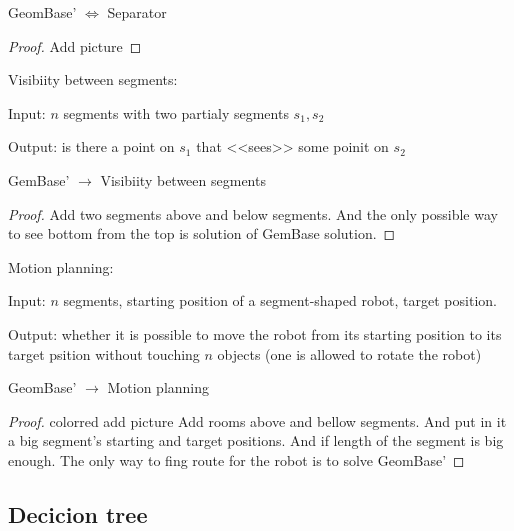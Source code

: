 \begin{lm}
	GeomBase' $\Leftrightarrow$ Separator
\end{lm}

\begin{proof}
	{\color{red} Add picture}
\end{proof}

\begin{df}
Visibiity between segments:

Input: $n $ segments with two partialy segments $s_1, s_2$ 

Output: is there a point on $s_1$ that <<sees>> some poinit on $s_2$

\end{df}

\begin{lm}
	GemBase' $\to$ Visibiity between segments
\end{lm}

\begin{proof}
	Add two segments above and below segments. And the only possible way to see bottom from the top is solution of GemBase solution.
\end{proof}

\begin{df}
	
Motion planning:

Input: $n $ segments, starting position of a segment-shaped robot, target position.

Output: whether it is possible to move the robot from its starting position to its target psition without touching $n $ objects (one is allowed to rotate the robot)

\end{df}

\begin{lm}
	GeomBase' $\to$ Motion planning
\end{lm}

\begin{proof}
	{color{red} add picture}
	Add rooms above and bellow segments. And put in it a big segment's starting and target positions. And if length of the segment is big  enough. The only way to fing route for the robot is to solve GeomBase'
\end{proof}

\subsection{Decicion tree}

